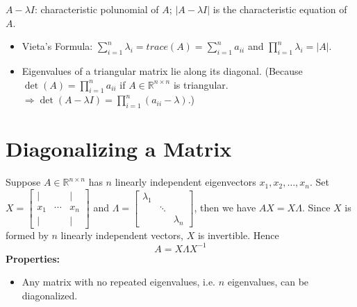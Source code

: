 \documentclass[14pt]{article}
\theoremstyle{definition}
\theoremstyle{remark}
\begin{document}
\begin{multicols}{2}
    $A-\lambda I$: characteristic polunomial of $A$; $|A-\lambda I|$ is the characteristic equation of $A$.
    \begin{itemize}
        \item Vieta's Formula: $\sum_{i=1}^n \lambda_i = trace(A) = \sum_{i=1}^n a_{ii}$ and $\prod_{i=1}^n \lambda_i = |A|$.
        \item Eigenvalues of a triangular matrix lie along its diagonal. (Because $\det(A)=\prod_{i=1}^n a_{ii}$ if $A\in \mathbb{R}^{n\times n}$ is triangular. $\Longrightarrow \det(A-\lambda I)=\prod_{i=1}^n (a_{ii}-\lambda)$.)
    \end{itemize}

    \section{Diagonalizing a Matrix}
    Suppose $A\in \mathbb{R}^{n\times n}$ has $n$ linearly independent eigenvectors $x_1, x_2, \ldots, x_n$. Set $X = \begin{bmatrix}
            |   &        & |   \\
            x_1 & \cdots & x_n \\
            |   &        & |
        \end{bmatrix}$ and $\Lambda = \begin{bmatrix}
            \lambda_1 &        &           \\
                      & \ddots &           \\
                      &        & \lambda_n
        \end{bmatrix}$, then we have $AX = X\Lambda$. Since $X$ is formed by $n$ linearly independent vectors, $X$ is invertible. Hence \[
        A = X\Lambda X^{-1}
    \]
    \textbf{Properties:}
    \begin{itemize}
        \item Any matrix with no repeated eigenvalues, i.e. $n$ eigenvalues, can be diagonalized.


\end{itemize}
\end{multicols}
\end{document}
